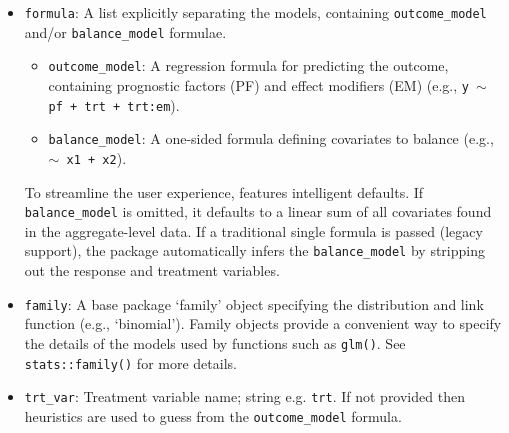 \documentclass[article]{jss}
\begin{document}
\begin{itemize}
\item \texttt{formula}: A list explicitly separating the models, containing \texttt{outcome\_model} and/or \texttt{balance\_model} formulae. 
    \begin{itemize}
        \item \texttt{outcome\_model}: A regression formula for predicting the outcome, containing prognostic factors (PF) and effect modifiers (EM) (e.g., \texttt{y $\sim$ pf + trt + trt:em}).
        \item \texttt{balance\_model}: A one-sided formula defining covariates to balance (e.g., \texttt{$\sim$ x1 + x2}).
    \end{itemize}
    To streamline the user experience,  features intelligent defaults. If \texttt{balance\_model} is omitted, it defaults to a linear sum of all covariates found in the aggregate-level data. If a traditional single formula is passed (legacy support), the package automatically infers the \texttt{balance\_model} by stripping out the response and treatment variables.
    \item \texttt{family}: A base   package `family' object specifying the distribution and link function (e.g., `binomial'). Family objects provide a convenient way to specify the details of the models used by functions such as \texttt{glm()}. See \texttt{stats::family()} for more details.
    \item \texttt{trt\_var}: Treatment variable name; string e.g. \texttt{trt}. If not provided then heuristics are used to guess from the \texttt{outcome\_model} formula.
\end{itemize}
\end{document}
